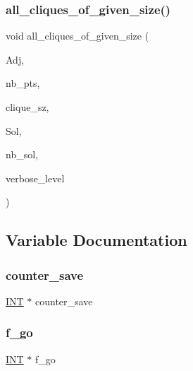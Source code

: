 \subsubsection{\texorpdfstring{all\+\_\+cliques\+\_\+of\+\_\+given\+\_\+size()}{all\_cliques\_of\_given\_size()}}
{\footnotesize\ttfamily void all\+\_\+cliques\+\_\+of\+\_\+given\+\_\+size (\begin{DoxyParamCaption}\item[{\mbox{\hyperlink{galois_8h_a09fddde158a3a20bd2dcadb609de11dc}{I\+NT}} $\ast$}]{Adj,  }\item[{\mbox{\hyperlink{galois_8h_a09fddde158a3a20bd2dcadb609de11dc}{I\+NT}}}]{nb\+\_\+pts,  }\item[{\mbox{\hyperlink{galois_8h_a09fddde158a3a20bd2dcadb609de11dc}{I\+NT}}}]{clique\+\_\+sz,  }\item[{\mbox{\hyperlink{galois_8h_a09fddde158a3a20bd2dcadb609de11dc}{I\+NT}} $\ast$\&}]{Sol,  }\item[{\mbox{\hyperlink{galois_8h_a09fddde158a3a20bd2dcadb609de11dc}{I\+NT}} \&}]{nb\+\_\+sol,  }\item[{\mbox{\hyperlink{galois_8h_a09fddde158a3a20bd2dcadb609de11dc}{I\+NT}}}]{verbose\+\_\+level }\end{DoxyParamCaption})}



\subsection{Variable Documentation}
\mbox{\label{clique__finder_8_c_ad7d589f4c9f1e616221d5cb2eda7cb88}} 
\subsubsection{\texorpdfstring{counter\+\_\+save}{counter\_save}}
{\footnotesize\ttfamily \mbox{\hyperlink{galois_8h_a09fddde158a3a20bd2dcadb609de11dc}{I\+NT}} $\ast$ counter\+\_\+save}

\mbox{\label{clique__finder_8_c_ab941e77fa95ca4915294024f82a438cc}} 
\subsubsection{\texorpdfstring{f\+\_\+go}{f\_go}}
{\footnotesize\ttfamily \mbox{\hyperlink{galois_8h_a09fddde158a3a20bd2dcadb609de11dc}{I\+NT}} $\ast$ f\+\_\+go}

